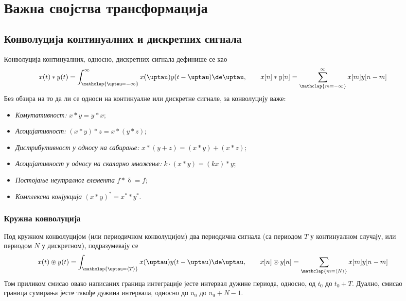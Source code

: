 \renewcommand{\thechapter}{S}
\setcounter{section}{0}
\chapter{Важна својства трансформација} \label{a:svojstva}


\section{Конволуција континуалних и дискретних сигнала}
Конволуција континуалних, односно, дискретних сигнала дефинише се као 
\begin{equation}
    x(t) \ast y(t) = \int_{\mathclap{\uptau = -\infty}}^{\infty} x(\uptau) y(t-\uptau) \de \uptau, 
    \qquad
    x[n] \ast y[n] = \sum_{\mathclap{m = -\infty}}^{\infty} x[m] y[n-m] 
\end{equation}
Без обзира на то да ли се односи на континуалне или дискретне сигнале, за конволуцију важе:
\begin{itemize}\itemsep0pt
    \item \emph{Комутативност:} $x \ast y = y \ast x$; \hfill \Svojstvo
    \item \emph{Асоцијативност:} $(x \ast y) \ast z = x \ast (y \ast z)$; \hfill \Svojstvo
    \item \emph{Дистрибутивност у односу на сабирање:} $x \ast (y + z) = (x \ast y) + (x \ast z)$; \hfill \Svojstvo
    \item \emph{Асоцијативност у односу на скаларно множење:} $k \cdot (x \ast y) = (kx) \ast y$; \hfill \Svojstvo
    \item \emph{Постојање неутралног елемента} $f \ast \updelta = f$; \hfill \Svojstvo
    \item \emph{Комплексна конјукција} $(x \ast y)^\ast = x^{\ast} \ast y^{\ast}$. \hfill \Svojstvo
\end{itemize}

\subsection{Кружна конволуција}
Под кружном конволуцијом (или периодичном конволуцијом) 
два периодична сигнала (са периодом $T$ у континуалном случају, или 
периодом $N$ у дискретном), подразумевају се 
\begin{equation}
    x(t) \circledast y(t) = \int_{\mathclap{\uptau = \langle T \rangle }} x(\uptau) y(t-\uptau) \de \uptau, 
    \qquad
    x[n] \circledast y[n] = \sum_{\mathclap{m = \langle N \rangle }} x[m] y[n-m] 
\end{equation}
Том приликом смисао овако написаних граница интеграције јесте интервал дужине периода, односно, од $t_0$ до $t_0 + T$. 
Дуално, смисао граница сумирања јесте такође дужина интервала, односно до $n_0$ до $n_0 + N - 1$. 

